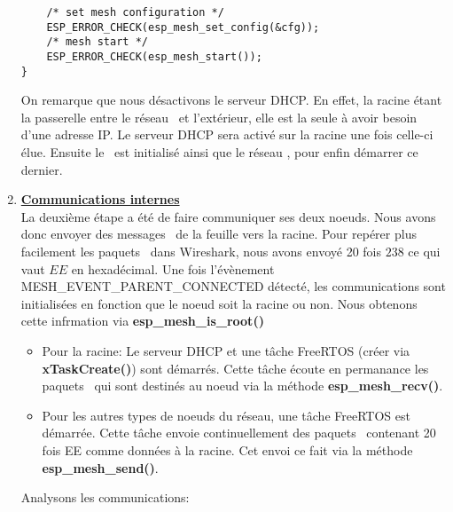 \begin{enumerate}
\begin{verbatim}
    /* set mesh configuration */
    ESP_ERROR_CHECK(esp_mesh_set_config(&cfg));
    /* mesh start */
    ESP_ERROR_CHECK(esp_mesh_start());
}
            \end{verbatim}
            On remarque que nous désactivons le serveur DHCP. En effet, la racine étant la passerelle entre 
            le réseau \espmesh\ et l'extérieur, elle est la seule à avoir besoin d'une adresse IP.
            Le serveur DHCP sera activé sur la racine une fois celle-ci élue.
            Ensuite le \wifi\ est initialisé ainsi que le réseau \espmesh, pour enfin démarrer ce dernier.
        \item \textbf{\underline{Communications internes}}\\
            La deuxième étape a été de faire communiquer ses deux noeuds. Nous avons donc envoyer des
            messages \espmesh\ de la feuille vers la racine.
            Pour repérer plus facilement les paquets \espmesh\ dans Wireshark, nous avons envoyé
            20 fois $238$ ce qui vaut $EE$ en hexadécimal.
            Une fois l'évènement MESH\_EVENT\_PARENT\_CONNECTED détecté, les communications sont initialisées
            en fonction que le noeud soit la racine ou non. Nous obtenons cette infrmation via \textbf{{esp\_mesh\_is\_root()}}
            \begin{itemize}
                \item Pour la racine: Le serveur DHCP et une tâche FreeRTOS (créer via \textbf{{xTaskCreate()}})
                sont démarrés. Cette tâche écoute en permanance les paquets \espmesh\ qui sont destinés au noeud via la méthode
                \textbf{{esp\_mesh\_recv()}}.
                \item Pour les autres types de noeuds du réseau, une tâche FreeRTOS est démarrée. Cette tâche envoie continuellement
                des paquets \espmesh\ contenant 20 fois EE comme données à la racine. Cet envoi ce fait via la méthode
                \textbf{{esp\_mesh\_send()}}.
            \end{itemize}
            Analysons les communications:\\
            \\
        

\end{enumerate}
